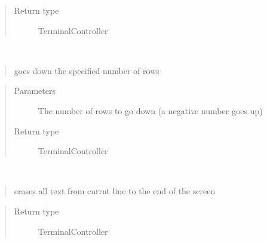 \documentclass[a4paper,10pt,english]{sphinxmanual}
\begin{document}
\begin{fulllineitems}
\begin{fulllineitems}
\begin{quote}
\begin{description}
\item[{Return type}] \leavevmode
TerminalController

\end{description}\end{quote}

\end{fulllineitems}


\begin{fulllineitems}
\label{\detokenize{api/termtools.terminal.TerminalController:termtools.terminal.TerminalController.down}}~\begin{quote}

goes down the specified number of rows
\end{quote}
\begin{quote}\begin{description}
\item[{Parameters}] \leavevmode
{} \textendash{} The number of rows to go down (a negative number goes up)

\item[{Return type}] \leavevmode
TerminalController

\end{description}\end{quote}

\end{fulllineitems}


\begin{fulllineitems}
\label{\detokenize{api/termtools.terminal.TerminalController:termtools.terminal.TerminalController.eraseDown}}~\begin{quote}

erases all text from currnt line to the end of the screen
\end{quote}
\begin{quote}\begin{description}
\item[{Return type}] \leavevmode
TerminalController

\end{description}\end{quote}

\end{fulllineitems}


\end{fulllineitems}
\end{document}
